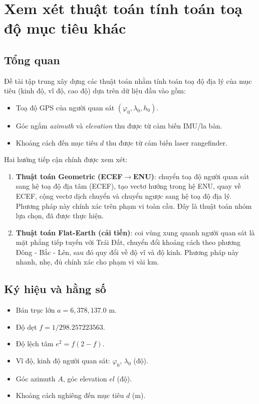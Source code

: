 \section{Xem xét thuật toán tính toán toạ độ mục tiêu khác}

\subsection{Tổng quan}
Đề tài tập trung xây dựng các thuật toán nhằm tính toán toạ độ địa lý của mục tiêu (kinh độ, vĩ độ, cao độ) dựa trên dữ liệu đầu vào gồm:
\begin{itemize}
    \item Toạ độ GPS của người quan sát $(\varphi_0, \lambda_0, h_0)$.
    \item Góc ngắm \textit{azimuth} và \textit{elevation} thu được từ cảm biến IMU/la bàn.
    \item Khoảng cách đến mục tiêu $d$ thu được từ cảm biến laser rangefinder.
\end{itemize}

Hai hướng tiếp cận chính được xem xét:
\begin{enumerate}
    \item \textbf{Thuật toán Geometric (ECEF$\rightarrow$ENU)}: chuyển toạ độ người quan sát sang hệ toạ độ địa tâm (ECEF), tạo vectơ hướng trong hệ ENU, quay về ECEF, cộng vectơ dịch chuyển và chuyển ngược sang hệ toạ độ địa lý. Phương pháp này chính xác trên phạm vi toàn cầu. Đây là thuật toán nhóm lựa chọn, đã được thực hiện.
    \item \textbf{Thuật toán Flat-Earth (cải tiến)}: coi vùng xung quanh người quan sát là mặt phẳng tiếp tuyến với Trái Đất, chuyển đổi khoảng cách theo phương Đông - Bắc - Lên, sau đó quy đổi về độ vĩ và độ kinh. Phương pháp này nhanh, nhẹ, đủ chính xác cho phạm vi vài km. 
\end{enumerate}

\subsection{Ký hiệu và hằng số}
\begin{itemize}
    \item Bán trục lớn $a = 6{,}378{,}137.0$ m.
    \item Độ dẹt $f = 1/298.257223563$.
    \item Độ lệch tâm $e^2 = f(2-f)$.
    \item Vĩ độ, kinh độ người quan sát: $\varphi_0$, $\lambda_0$ (độ).
    \item Góc azimuth $A$, góc elevation $el$ (độ).
    \item Khoảng cách nghiêng đến mục tiêu $d$ (m).
\end{itemize}

